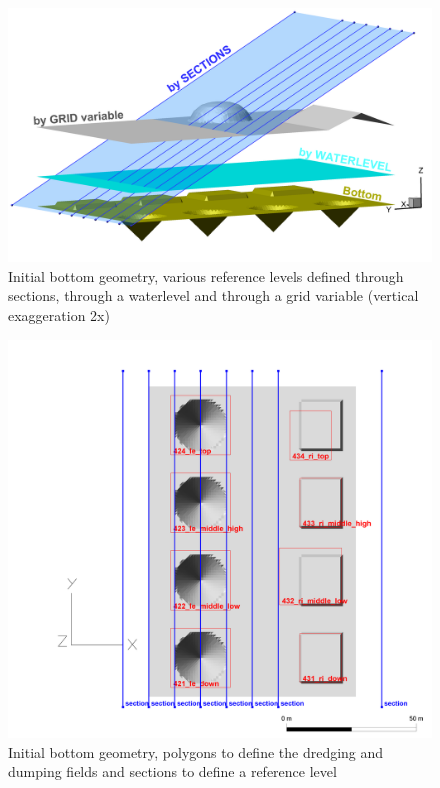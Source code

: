 \begin{figure} [H]
  \centering
 \includegraphics[scale=0.13]{img/Bild_Bottom_ZRL_3D_neu.png}
  \caption{Initial bottom geometry, various reference levels defined through sections, through a waterlevel and
  through a grid variable (vertical exaggeration 2x)}
  \label{refl3D}
\end{figure}

\newpage
\begin{figure} [H]
 \centering
 \includegraphics[scale=0.15]{img/Bild_4cones_Lageplan_DigPoly_Sections_2D.png}
 \caption{Initial bottom geometry, polygons to define the dredging and dumping fields
  and sections to define a reference level}
 \label{geom2D}
\end{figure}

